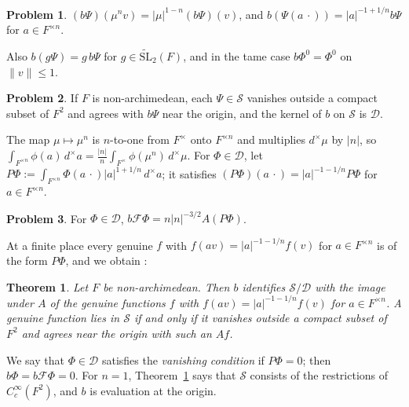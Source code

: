 \documentclass[reqno]{amsart}
\newcommand{\tSL}{\widetilde{\mathrm{SL}}_2}
\newcommand{\Fc}{\mathcal{F}}
\newcommand{\Dc}{\mathcal{D}}
\newcommand{\Sc}{\mathcal{S}}
\numberwithin{equation}{section}
\theoremstyle{definition}
\newtheorem{problem}{Problem}[section]
\theoremstyle{plain}
\newtheorem{theorem}{Theorem}[section]
\begin{document}
\begin{problem}\label{pr:leading-homog}
  $(b \Psi)(\mu^n v) = \lvert \mu \rvert^{1-n} (b \Psi)(v)$, and $b(\Psi(a \, \cdot)) = \lvert a \rvert^{-1 + 1/n} b \Psi$ for $a \in F^{\times n}$.
\end{problem}

Also $b(g \Psi) = g \, b \Psi$ for $g \in \tSL(F)$, and in the tame case $b \Phi^0 = \Phi^0$ on $\lVert v \rVert \leq 1$.

\begin{problem}\label{pr:finite-germs}
  If $F$ is non-archimedean, each $\Psi \in \Sc$ vanishes outside a compact subset of $F^2$ and agrees with $b \Psi$ near the origin, and the kernel of $b$ on $\Sc$ is $\Dc$.
\end{problem}

The map $\mu \mapsto \mu^n$ is $n$-to-one from $F^\times$ onto $F^{\times n}$ and multiplies $d^\times \mu$ by $\lvert n \rvert$, so $\int_{F^{\times n}} \phi(a) \, d^\times a = \frac{\lvert n \rvert}{n} \int_{F^\times} \phi(\mu^n) \, d^\times \mu$.  For $\Phi \in \Dc$, let $P \Phi := \int_{F^{\times n}} \Phi(a \, \cdot) \lvert a \rvert^{1 + 1/n} \, d^\times a$; it satisfies $(P \Phi)(a \, \cdot) = \lvert a \rvert^{-1-1/n} P \Phi$ for $a \in F^{\times n}$.

\begin{problem}\label{pr:germ-average}
  For $\Phi \in \Dc$, $b \Fc \Phi = n \lvert n \rvert^{-3/2} A(P \Phi)$.
\end{problem}

At a finite place every genuine $f$ with $f(a v) = \lvert a \rvert^{-1-1/n} f(v)$ for $a \in F^{\times n}$ is of the form $P \Phi$, and we obtain \cite[Corollary~8.4]{N}:

\begin{theorem}\label{th:finite-schwartz}
  Let $F$ be non-archimedean.  Then $b$ identifies $\Sc / \Dc$ with the image under $A$ of the genuine functions $f$ with $f(a v) = \lvert a \rvert^{-1-1/n} f(v)$ for $a \in F^{\times n}$.  A genuine function lies in $\Sc$ if and only if it vanishes outside a compact subset of $F^2$ and agrees near the origin with such an $A f$.
\end{theorem}

We say that $\Phi \in \Dc$ satisfies the \emph{vanishing condition} if $P \Phi = 0$; then $b \Phi = b \Fc \Phi = 0$.  For $n = 1$, Theorem~\ref{th:finite-schwartz} says that $\Sc$ consists of the restrictions of $C_c^\infty(F^2)$, and $b$ is evaluation at the origin.
\end{document}
